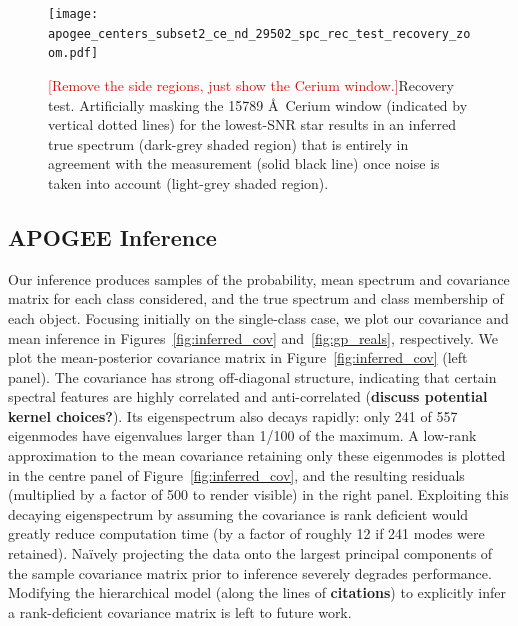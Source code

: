 \documentclass[a4paper,fleqn,usenatbib]{mnras}
\begin{document}
\begin{figure}
	\texttt{[image: apogee\_centers\_subset2\_ce\_nd\_29502\_spc\_rec\_test\_recovery\_zoom.pdf]}
    \caption{\textcolor{red}{[Remove the side regions, just show the Cerium window.]}Recovery test. Artificially masking the 15789 \AA\ Cerium window (indicated by vertical dotted lines) for the lowest-SNR star results in an inferred true spectrum (dark-grey shaded region) that is entirely in agreement with the measurement (solid black line) once noise is taken into account (light-grey shaded region).}
    \label{fig:recovery_test}
\end{figure}

\subsection{APOGEE Inference}

Our inference produces samples of the probability, mean spectrum and covariance matrix for each class considered, and the true spectrum and class membership of each object. Focusing initially on the single-class case, we plot our covariance and mean inference in Figures~\ref{fig:inferred_cov} and~\ref{fig:gp_reals}, respectively. We plot the mean-posterior covariance matrix in Figure~\ref{fig:inferred_cov} (left panel). The covariance has strong off-diagonal structure, indicating that certain spectral features are highly correlated and anti-correlated ({\bf discuss potential kernel choices?}). Its eigenspectrum also decays rapidly: only 241 of 557 eigenmodes have eigenvalues larger than 1/100 of the maximum. A low-rank approximation to the mean covariance retaining only these eigenmodes is plotted in the centre panel of Figure~\ref{fig:inferred_cov}, and the resulting residuals (multiplied by a factor of 500 to render visible) in the right panel. Exploiting this decaying eigenspectrum by assuming the covariance is rank deficient would greatly reduce computation time (by a factor of roughly 12 if 241 modes were retained). Na\"ively projecting the data onto the largest principal components of the sample covariance matrix prior to inference severely degrades performance. Modifying the hierarchical model (along the lines of {\bf citations}) to explicitly infer a rank-deficient covariance matrix is left to future work.
\end{document}
